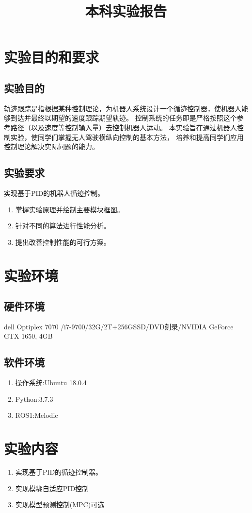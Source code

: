\documentclass{xjtureport}
\title{本科实验报告}
\date{\zhtoday}
\begin{document}
\makecover
\makeheader

\section{实验目的和要求}
\subsection{实验目的}
轨迹跟踪是指根据某种控制理论，为机器人系统设计一个循迹控制器，使机器人能够到达并最终以期望的速度跟踪期望轨迹。
控制系统的任务即是严格按照这个参考路径（以及速度等控制输入量）去控制机器人运动。
本实验旨在通过机器人控制实验，使同学们掌握无人驾驶横纵向控制的基本方法，
培养和提高同学们应用控制理论解决实际问题的能力。

\subsection{实验要求}
实现基于PID的机器人循迹控制。
\begin{enumerate}
    \item 掌握实验原理并绘制主要模块框图。
    \item 针对不同的算法进行性能分析。
    \item 提出改善控制性能的可行方案。
\end{enumerate}
\section{实验环境}
\subsection{硬件环境}
dell Optiplex 7070 /i7-9700/32G/2T+256GSSD/DVD刻录/NVIDIA GeForce GTX 1650, 4GB
\subsection{软件环境}
\begin{enumerate}
    \item 操作系统:Ubuntu 18.0.4
    \item Python:3.7.3
    \item ROS1:Melodic
\end{enumerate}

\section{实验内容}
\begin{enumerate}
    \item 实现基于PID的循迹控制器。
    \item 实现模糊自适应PID控制
    \item 实现模型预测控制(MPC)可选
\end{enumerate}
\end{document}
